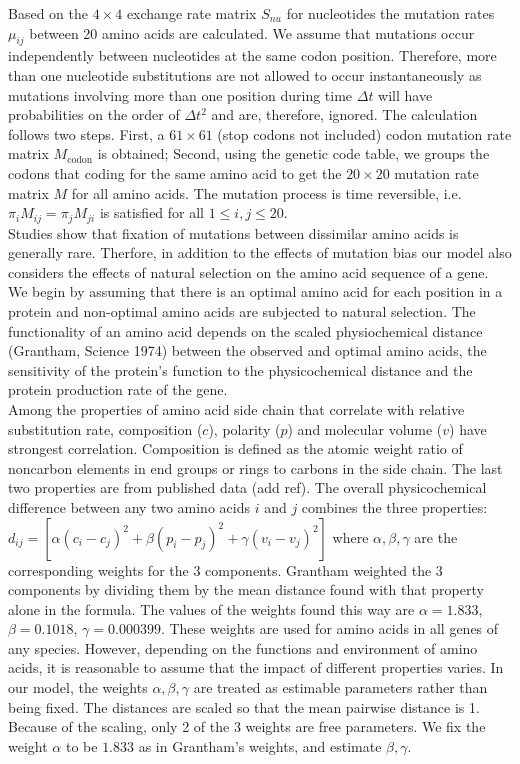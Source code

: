 \documentclass[13pt]{article}
\begin{document}
Based on the $4 \times 4$ exchange rate matrix $S_{nu}$ for nucleotides the mutation rates $\mu_{ij}$ between 20 amino acids are calculated. We assume that mutations occur independently between nucleotides at the same codon position. Therefore, more than one nucleotide substitutions are not allowed to occur instantaneously as mutations involving more than one position during time $\Delta t$ will have probabilities on the order of $\Delta t^2$ and are, therefore, ignored. The calculation follows two steps. First, a $61 \times 61$ (stop codons not included) codon mutation rate matrix $M_{\text{codon}}$ is obtained; Second, using the genetic code table, we groups the codons that coding for the same amino acid to get the $20 \times 20$ mutation rate matrix $M$ for all amino acids. The mutation process is time reversible, i.e. $\pi_i M_{ij} = \pi_j M_{ji}$ is satisfied for all $1 \le i, j \le 20$.\\

Studies show that fixation of mutations between dissimilar amino acids is generally rare. Therfore, in addition to the effects of mutation bias our model also considers the effects of natural selection on the amino acid sequence of a gene. We begin by assuming that there is an optimal amino acid for each position in a protein and non-optimal amino acids are subjected to natural selection. The functionality of an amino acid depends on the scaled physiochemical distance (Grantham, Science 1974) between the observed and optimal amino acids, the sensitivity of the protein's function to the physicochemical distance and the protein production rate of the gene. \\

Among the properties of amino acid side chain that correlate with relative substitution rate, composition ($c$), polarity ($p$) and molecular volume ($v$) have strongest correlation. Composition is defined as the atomic weight ratio of noncarbon elements in end groups or rings to carbons in the side chain. The last two properties are from published data (add ref). The overall physicochemical difference between any two amino acids $i$ and $j$ combines the three properties: $d_{ij} = [\alpha (c_i-c_j)^2 + \beta (p_i - p_j)^2 + \gamma (v_i - v_j)^2]$ where $\alpha, \beta, \gamma$ are the corresponding weights for the 3 components. Grantham weighted the 3 components by dividing them by the mean distance found with that property alone in the formula. The values of the weights found this way are $\alpha = 1.833$, $\beta = 0.1018$, $\gamma = 0.000399$. These weights are used for amino acids in all genes of any species. However, depending on the functions and environment of amino acids, it is reasonable to assume that the impact of different properties varies. In our model, the weights $\alpha, \beta, \gamma$ are treated as estimable parameters rather than being fixed. The distances are scaled so that the mean pairwise distance is 1. Because of the scaling, only 2 of the 3 weights are free parameters. We fix the weight $\alpha$ to be $1.833$ as in Grantham's weights, and estimate $\beta, \gamma$. \\
\end{document}
